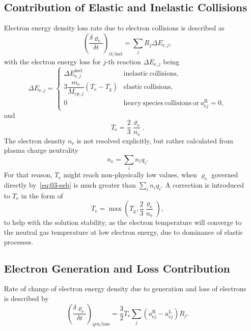 \subsection{Contribution of Elastic and Inelastic Collisions}
\label{subsec:03-contribution-of-elastic-and-inelastic-collisions}
Electron energy density loss rate due to electron collisions is described as
\begin{equation}
    \left( \frac{\delta \varrho_{\mathrm{e}}}{\delta t} \right)_{\mathrm{el/inel}} =
    \sum_{j} R_{j} \Delta E_{\mathrm{e}, j}
    ,
\end{equation}
with the electron energy loss for $j$-th reaction $\Delta E_{\mathrm{e}, j}$ being
\begin{equation}
    \Delta E_{\mathrm{e}, j} =
    \begin{cases}
        \Delta E_{\mathrm{e}, j}^{\mathrm{inel}} & \mathrm{inelastic~collisions}, \\
        3 \dfrac{m_{\mathrm{e}}}{M_{\mathrm{cp}, j}} (T_{\mathrm{e}} - T_{\mathrm{g}}) & \mathrm{elastic~collisions}, \\
        0 & \mathrm{heavy~species~collisions~or}~a_{\mathrm{e}j}^{\mathrm{R}}=0,
    \end{cases}
\end{equation}
and
\begin{equation}
    T_{\mathrm{e}} = \frac{2}{3} \frac{\varrho_{\mathrm{e}}}{n_{\mathrm{e}}}.
\end{equation}
The electron density $n_{\mathrm{e}}$ is not resolved explicitly, but rather calculated from plasma charge neutrality
\begin{equation}
    n_{\mathrm{e}} = \sum_{i} n_{i}q_{i}.
\end{equation}
For that reason, $T_{\mathrm{e}}$ might reach non-physically low values, when $\varrho_{\mathrm{e}}$ governed directly
by~\eqref{eq:03-eeb} is much greater than $\sum_{i} n_{i}q_{i}$.
A correction is introduced to $T_{\mathrm{e}}$ in the form of
\begin{equation}
    T_{\mathrm{e}} = \max \left( T_{\mathrm{g}}, \frac{2}{3} \frac{\varrho_{\mathrm{e}}}{n_{\mathrm{e}}} \right),
\end{equation}
to help with the solution stability, as the electron temperature will converge to the neutral gas temperature at low
electron energy, due to dominance of elastic processes.

\subsection{Electron Generation and Loss Contribution}\label{subsec:03-electron-generation-and-loss-contribution}
Rate of change of electron energy density due to generation and loss of electrons is described by
\begin{equation}
    \left( \frac{\delta \varrho_{\mathrm{e}}}{\delta t} \right)_{\mathrm{gen/loss}} =
    \frac{3}{2} T_{\mathrm{e}} \sum_{j} (a_{\mathrm{e}j}^{\mathrm{R}} - a_{\mathrm{e}j}^{\mathrm{L}}) R_{j}.
\end{equation}

